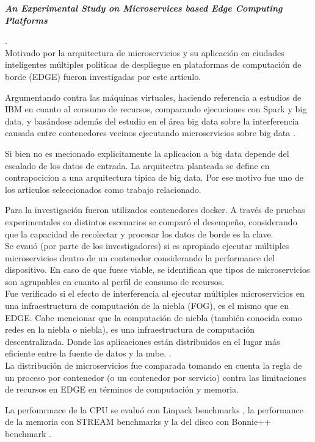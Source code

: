 \textbf{\emph{An Experimental Study on Microservices based Edge Computing Platforms}}

 \cite{qu_experimental_2020}.
\\
Motivado por la arquitectura de microservicios y su aplicación en ciudades inteligentes
múltiples políticas de despliegue en plataformas de computación de borde (EDGE) fueron investigadas por este artículo.

Argumentando contra las máquinas virtuales, haciendo referencia a estudios de IBM en cuanto al consumo de recursos, 
comparando ejecuciones con Spark \cite{ApacheSpark} y big data, y basándose además del estudio en el área big data sobre la interferencia causada entre contenedores vecinos ejecutando microservicios sobre big data \cite{BigDataWikipedia}.

Si bien no es mecionado explicitamente la aplicacion a big data depende del escalado de los datos de entrada. La arquitectra planteada se define en contrapocicion a una arquitectura tipica de big data. Por ese motivo fue uno de los articulos seleccionados como trabajo relacionado.

Para la investigación fueron utilizados contenedores docker. A través de pruebas experimentales en distintos escenarios se comparó el desempeño, considerando que la capacidad de recolectar y procesar los datos de borde es la clave.\\
Se evauó (por parte de los investigadores) si es apropiado ejecutar múltiples microservicios dentro de un contenedor considerando la performance del dispositivo.
En caso de que fuese viable, se identifican que tipos de microservicios son agrupables en cuanto al perfil de consumo de recursos.\\
Fue verificado si el efecto de interferencia al ejecutar múltiples microservicios en una infraestructura de computación de la niebla (FOG), es el mismo que en EDGE. Cabe mencionar que la computación de niebla (también conocida como redes en la niebla o niebla),
es una infraestructura de computación descentralizada. Donde las aplicaciones están distribuidos en el lugar más eficiente entre la fuente de datos y la nube.
\cite{webfog}.
\\
La distribución de microservicios fue comparada tomando en cuenta la regla de un proceso por contenedor (o un contenedor por servicio) 
\cite{cont_por_serv} 
contra las limitaciones de recursos en EDGE en términos de computación y memoria.

La perfomrmace de la CPU se evaluó con Linpack benchmarks 
\cite{LINPACKBenchmarksWikipedia}, la performance de la memoria con STREAM benchmarks 
\cite{STREAMBenchmarkAMD} 
y la del disco con Bonnie++ benchmark \cite{BonnieWikipedia}.

